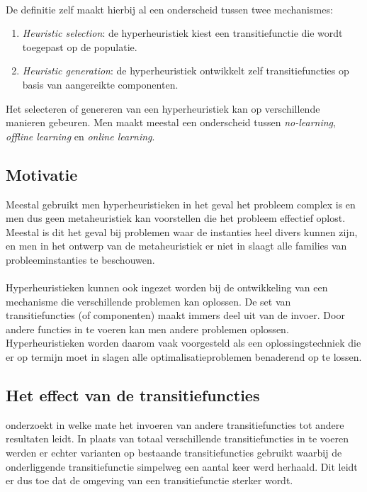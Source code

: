 \paragraph{}
De definitie zelf maakt hierbij al een onderscheid tussen twee mechanismes\cite{Burke_aclassification}:
\begin{enumerate}
 \item \emph{Heuristic selection}: de hyperheuristiek kiest een transitiefunctie die wordt toegepast op de populatie.
 \item \emph{Heuristic generation}: de hyperheuristiek ontwikkelt zelf transitiefuncties op basis van aangereikte componenten.
\end{enumerate}

Het selecteren of genereren van een hyperheuristiek kan op verschillende manieren gebeuren. Men maakt meestal een onderscheid tussen \emph{no-learning}, \emph{offline learning} en \emph{online learning}.

\subsection{Motivatie}
Meestal gebruikt men hyperheuristieken in het geval het probleem complex is en men dus geen metaheuristiek kan voorstellen die het probleem effectief oplost. Meestal is dit het geval bij problemen waar de instanties heel divers kunnen zijn, en men in het ontwerp van de metaheuristiek er niet in slaagt alle families van probleeminstanties te beschouwen.

\paragraph{}
Hyperheuristieken kunnen ook ingezet worden bij de ontwikkeling van een mechanisme die verschillende problemen kan oplossen. De set van transitiefuncties (of componenten) maakt immers deel uit van de invoer. Door andere functies in te voeren kan men andere problemen oplossen. Hyperheuristieken worden daarom vaak voorgesteld als een oplossingstechniek die er op termijn moet in slagen alle optimalisatieproblemen benaderend op te lossen.

\subsection{Het effect van de transitiefuncties}
\cite{misirEffect} onderzoekt in welke mate het invoeren van andere transitiefuncties tot andere resultaten leidt. In plaats van totaal verschillende transitiefuncties in te voeren werden er echter varianten op bestaande transitiefuncties gebruikt waarbij de onderliggende transitiefunctie simpelweg een aantal keer werd herhaald. Dit leidt er dus toe dat de omgeving van een transitiefunctie sterker wordt.

